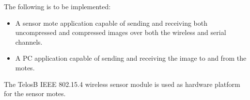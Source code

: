 The following is to be implemented:
\begin{itemize}
\item A sensor mote application capable of sending and receiving both uncompressed and compressed images over both the wireless and serial channels.
\item A PC application capable of sending and receiving the image to and from the motes.
\end{itemize} 

The TelosB IEEE 802.15.4 wireless sensor module is used as hardware platform for the sensor motes.
 

